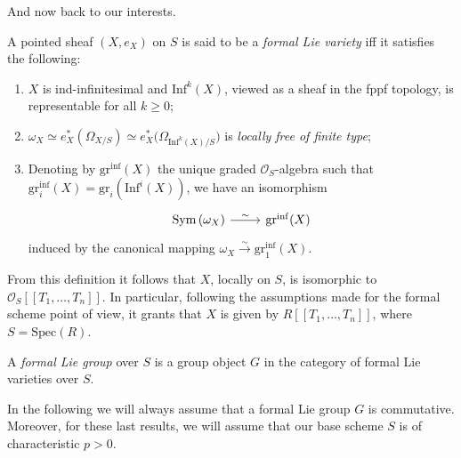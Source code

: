 \documentclass[../Main]{subfiles}
\begin{document}
\noindent
And now back to our interests.
\begin{defn}\label{defn:FormalLieVarfppf}
	A pointed sheaf $\left(X, e_X\right)$ on $S$ is said to be
	a {\em formal Lie variety} iff it satisfies the following:
\begin{enumerate}
	\item $X$ is ind-infinitesimal and $\mathrm{Inf}^k(X)$, viewed
		as a sheaf in the fppf topology,
		is representable for all $k \geq 0$;
	\item $\omega_X \simeq
		e_X^* \left( \Omega_{X/S} \right) \simeq
		e_X^* \big( \Omega_{\mathrm{Inf}^k(X)/S} \big)$
		is {\em locally free of finite type};
	\item Denoting by $\mathrm{gr}^{\mathrm{inf}}(X)$ the unique graded $\mathcal{O}_{ S }$-algebra
		such that $\mathrm{gr}^{\mathrm{inf}}_i(X) = \mathrm{gr}_i(\mathrm{Inf}^i(X))$,
		we have an isomorphism
		\begin{equation*}
		\begin{tikzcd}[row sep = 0ex
			,/tikz/column 1/.append style={anchor=base east}
			,/tikz/column 2/.append style={anchor=base west}]
		\mathrm{Sym}\left( \omega_X \right) \arrow[r, "\sim", rightarrow] &
				\mathrm{gr}^{\mathrm{inf}}(X)
		\end{tikzcd}
		\end{equation*}
		induced by the canonical mapping
		$\omega_X \xrightarrow{\sim} \mathrm{gr}_1^{\mathrm{inf}}(X)$.
\end{enumerate}
\end{defn}


\begin{rem}\label{rem:FormalLieVarietyPowerSeries}
	From this definition it follows that $X$, locally on $S$,
	is isomorphic to $\mathcal{O}_S [\![ T_1, \ldots, T_n ]\!]$.
	In particular, following the assumptions made for the formal scheme point of view,
	it grants that $X$ is given by
	$R [\![ T_1, \ldots, T_n ]\!]$,
	where $S = \mathrm{Spec}(R)$.
\end{rem}


\begin{defn}
	A {\em formal Lie group} over $S$ is a group object $G$
	in the category of formal Lie varieties over $S$.
\end{defn}

\noindent
In the following we will always assume that a formal Lie group $G$
is commutative.
Moreover, for these last results, we will assume that
our base scheme $S$ is of characteristic $p  > 0$.
\end{document}
